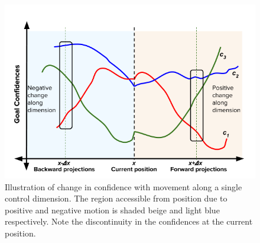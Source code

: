 \documentclass[conference]{IEEEtran}
\begin{document}
%

\begin{figure}
	\includegraphics[width = 1\hsize, height = 0.26\vsize]{./figures/DisambMetric.png}
	\vspace{-0.4cm}
	\caption{Illustration of change in confidence with movement along a single control dimension. The region accessible from position  due to positive and negative motion is shaded beige and light blue respectively. Note the discontinuity in the confidences at the current position.}
	\label{DM_FIG}
\end{figure}
\end{document}
